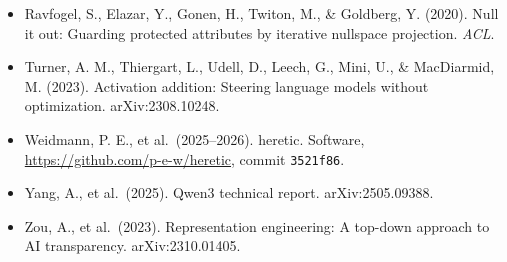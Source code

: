 \documentclass[
  10pt,
]{article}
\begin{document}
\begin{itemize}
  Radford, A., Wu, J., Child, R., Luan, D., Amodei, D., \& Sutskever, I.
  (2019). Language models are unsupervised multitask learners. OpenAI.
\item
  Ravfogel, S., Elazar, Y., Gonen, H., Twiton, M., \& Goldberg, Y.
  (2020). Null it out: Guarding protected attributes by iterative
  nullspace projection. \emph{ACL}.
\item
  Turner, A. M., Thiergart, L., Udell, D., Leech, G., Mini, U., \&
  MacDiarmid, M. (2023). Activation addition: Steering language models
  without optimization. arXiv:2308.10248.
\item
  Weidmann, P. E., et al.~(2025--2026). heretic. Software,
  \url{https://github.com/p-e-w/heretic}, commit \texttt{3521f86}.
\item
  Yang, A., et al.~(2025). Qwen3 technical report. arXiv:2505.09388.
\item
  Zou, A., et al.~(2023). Representation engineering: A top-down
  approach to AI transparency. arXiv:2310.01405.
\end{itemize}
\end{document}
